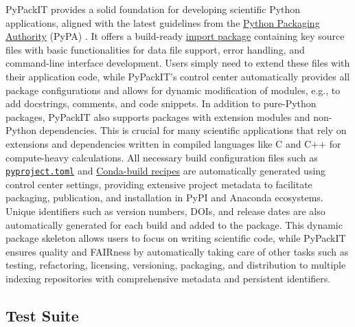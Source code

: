 \documentclass{article}
\begin{document}
PyPackIT provides a solid foundation for developing scientific Python applications, aligned with the latest guidelines from the \href{https://www.pypa.io/}{Python Packaging Authority} (PyPA) \cite{PythonPackagingUserGuide}. It offers a build-ready \href{https://packaging.python.org/en/latest/glossary/#term-Import-Package}{import package} containing key source files with basic functionalities for data file support, error handling, and command-line interface development. Users simply need to extend these files with their application code, while PyPackIT's control center automatically provides all package configurations and allows for dynamic modification of modules, e.g., to add docstrings, comments, and code snippets. In addition to pure-Python packages, PyPackIT also supports packages with extension modules and non-Python dependencies. This is crucial for many scientific applications that rely on extensions and dependencies written in compiled languages like C and C++ for compute-heavy calculations. All necessary build configuration files such as \href{https://packaging.python.org/en/latest/specifications/pyproject-toml/}{\texttt{pyproject.toml}} and \href{https://docs.conda.io/projects/conda-build/en/latest/concepts/recipe.html}{Conda-build recipes} are automatically generated using control center settings, providing extensive project metadata to facilitate packaging, publication, and installation in PyPI and Anaconda ecosystems. Unique identifiers such as version numbers, DOIs, and release dates are also automatically generated for each build and added to the package. This dynamic package skeleton allows users to focus on writing scientific code, while PyPackIT ensures quality and FAIRness by automatically taking care of other tasks such as testing, refactoring, licensing, versioning, packaging, and distribution to multiple indexing repositories with comprehensive metadata and persistent identifiers.

\subsection{Test Suite}
\end{document}
